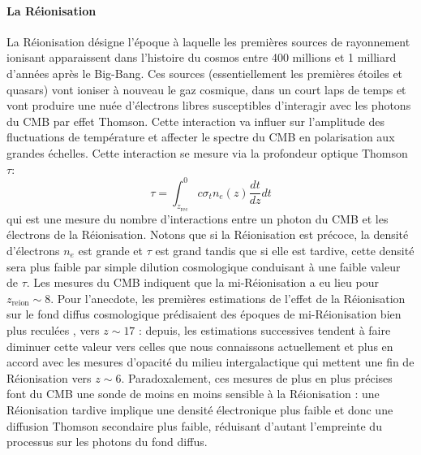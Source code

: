 \paragraph{La Réionisation} 
La Réionisation désigne l'époque à laquelle les premières sources de rayonnement ionisant apparaissent dans l'histoire du cosmos entre 400 millions et 1 milliard d'années après le Big-Bang. Ces sources (essentiellement les premières étoiles et quasars) vont ioniser à nouveau le gaz cosmique, dans un court laps de temps et vont produire une nuée d'électrons libres susceptibles d'interagir avec les photons du CMB par effet Thomson. Cette interaction va influer sur l'amplitude des fluctuations de température et affecter le spectre du CMB en polarisation aux grandes échelles. Cette interaction se mesure via la profondeur optique Thomson $\tau$:
\begin{equation}
\tau=\int_{z_\mathrm{rec}}^{0} c\sigma_t n_e(z)\frac{dt}{dz}dt
\end{equation}
qui est une mesure du nombre d'interactions entre un photon du CMB et les électrons de la Réionisation. Notons que si la Réionisation est précoce, la densité d'électrons $n_e$ est grande et $\tau$ est grand tandis que si elle est tardive, cette densité sera plus faible par simple dilution cosmologique conduisant à une faible valeur de $\tau$. Les mesures du CMB indiquent que la mi-Réionisation a eu lieu pour $z_\mathrm{reion}\sim8$. Pour l'anecdote, les premières estimations de l'effet de la Réionisation sur le fond diffus cosmologique prédisaient des époques de mi-Réionisation bien plus reculées , vers $z\sim 17$ : depuis, les estimations successives tendent à faire diminuer cette valeur vers celles que nous connaissons actuellement et plus en accord avec les mesures d'opacité du milieu intergalactique qui mettent une fin de Réionisation vers $z\sim 6$. Paradoxalement, ces mesures de plus en plus précises font du CMB une sonde de moins en moins sensible à la Réionisation : une Réionisation tardive implique une densité électronique plus faible et donc une diffusion Thomson secondaire plus faible, réduisant d'autant l'empreinte du processus sur les photons du fond diffus.

